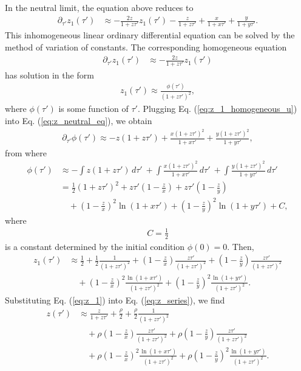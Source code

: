 \documentclass[11pt]{article}
\begin{document}
In the neutral limit, the equation above reduces to
\begin{align}\label{eq:z_neutral_eq}
    \partial_{\tau'}z_1(\tau') &\approx - \frac{2z}{1+z\tau'}z_1(\tau') - \frac{z}{1+z\tau'} + \frac{x}{1+x\tau'} + \frac{y}{1+y\tau'}.
\end{align}
This inhomogeneous linear ordinary differential equation can be solved by the method of variation of constants. The corresponding homogeneous equation 
\begin{align}
    \partial_{\tau'}z_1(\tau') &\approx - \frac{2z}{1+z\tau'}z_1(\tau')
\end{align}
has solution in the form
\begin{align}\label{eq:z_1_homogeneous_u}
    z_1(\tau') \approx \frac{\phi(\tau')}{(1+z\tau')^2},
\end{align}
where $\phi(\tau')$ is some function of $\tau'$. Plugging Eq. (\ref{eq:z_1_homogeneous_u}) into Eq. (\ref{eq:z_neutral_eq}), we obtain
\begin{align}
    \partial_{\tau'} \phi(\tau') \approx - z(1+z\tau') + \frac{x(1+z\tau')^2}{1+x\tau'} + \frac{y(1+z\tau')^2}{1+y\tau'},
\end{align}
from where
\begin{align}
    \phi(\tau') &\approx - \int z(1+z\tau') \,d\tau'\
    + \int \frac{x(1+z\tau')^2}{1+x\tau'} \,d\tau'\
    + \int \frac{y(1+z\tau')^2}{1+y\tau'} \,d\tau'\, \\\nonumber
    &= \frac{1}{2} (1+z\tau')^2 + z\tau'\left(1 - \frac{z}{x}\right) + z\tau'\left(1 - \frac{z}{y}\right)
     \\\nonumber
    &\quad + \left(1-\frac{z}{x}\right)^2\ln(1+x\tau')
    + \left(1-\frac{z}{y}\right)^2\ln(1+y\tau') + C,
\end{align}
where 
\begin{align}
    C = \frac{1}{2}
\end{align} is a constant determined by the initial condition $\phi(0)=0$. Then, 
\begin{align}\label{eq:z_1}
    z_1(\tau') &\approx \frac{1}{2} 
    + \frac{1}{2}\frac{1}{(1+z\tau')^2} + \left(1-\frac{z}{x}\right)\frac{z\tau'}{(1+z\tau')^2} + \left(1-\frac{z}{y}\right)\frac{z\tau'}{(1+z\tau')^2}
         \\\nonumber
    &\quad + \left(1-\frac{z}{x}\right)^2 \frac{\ln(1+x\tau')}{(1+z\tau')^2}
    + \left(1-\frac{z}{y}\right)^2 \frac{\ln(1+y\tau')}{(1+z\tau')^2}.
\end{align}
Substituting Eq. (\ref{eq:z_1}) into Eq. (\ref{eq:z_series}), we find
\begin{align}
    z(\tau') &\approx \frac{z}{1+z\tau'} 
    + \frac{\rho}{2}
    + \frac{\rho}{2}\frac{1}{(1+z\tau')^2} 
    \\\nonumber
    &\quad + \rho\left(1-\frac{z}{x}\right)\frac{z\tau'}{(1+z\tau')^2} + \rho\left(1-\frac{z}{y}\right)\frac{z\tau'}{(1+z\tau')^2}
    \\\nonumber
    &\quad + \rho\left(1-\frac{z}{x}\right)^2 \frac{\ln(1+x\tau')}{(1+z\tau')^2}
    + \rho\left(1-\frac{z}{y}\right)^2 \frac{\ln(1+y\tau')}{(1+z\tau')^2}.
\end{align}
\end{document}
